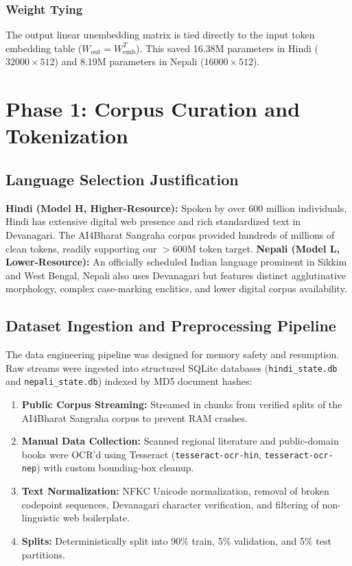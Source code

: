 \documentclass[10pt,a4paper]{article}
\begin{document}
\subsubsection{Weight Tying}
The output linear unembedding matrix is tied directly to the input token embedding table ($W_{\text{out}} = W_{\text{emb}}^T$). This saved 16.38M parameters in Hindi ($32000 \times 512$) and 8.19M parameters in Nepali ($16000 \times 512$).

\section{Phase 1: Corpus Curation and Tokenization}

\subsection{Language Selection Justification}
\textbf{Hindi (Model H, Higher-Resource):} Spoken by over 600 million individuals, Hindi has extensive digital web presence and rich standardized text in Devanagari. The AI4Bharat Sangraha corpus provided hundreds of millions of clean tokens, readily supporting our $>600\text{M}$ token target.
\textbf{Nepali (Model L, Lower-Resource):} An officially scheduled Indian language prominent in Sikkim and West Bengal, Nepali also uses Devanagari but features distinct agglutinative morphology, complex case-marking enclitics, and lower digital corpus availability.

\subsection{Dataset Ingestion and Preprocessing Pipeline}
The data engineering pipeline was designed for memory safety and resumption. Raw streams were ingested into structured SQLite databases (\texttt{hindi\_state.db} and \texttt{nepali\_state.db}) indexed by MD5 document hashes:
\begin{enumerate}[noitemsep,leftmargin=*]
    \item \textbf{Public Corpus Streaming:} Streamed in chunks from verified splits of the AI4Bharat Sangraha corpus to prevent RAM crashes.
    \item \textbf{Manual Data Collection:} Scanned regional literature and public-domain books were OCR'd using Tesseract (\texttt{tesseract-ocr-hin}, \texttt{tesseract-ocr-nep}) with custom bounding-box cleanup.
    \item \textbf{Text Normalization:} NFKC Unicode normalization, removal of broken codepoint sequences, Devanagari character verification, and filtering of non-linguistic web boilerplate.
    \item \textbf{Splits:} Deterministically split into 90\% train, 5\% validation, and 5\% test partitions.
\end{enumerate}
\end{document}
